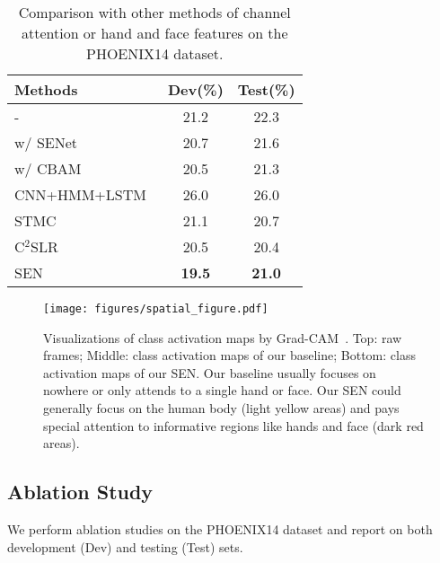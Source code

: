 \documentclass[letterpaper]{article} \usepackage{aaai23}  \usepackage{times}  \usepackage{helvet}  \usepackage{courier}  \usepackage[hyphens]{url}  \usepackage{graphicx} \urlstyle{rm} \def\UrlFont{\rm}  \usepackage{natbib}  \usepackage{caption} \frenchspacing  \setlength{\pdfpagewidth}{8.5in} \setlength{\pdfpageheight}{11in} \usepackage{algorithm}
\begin{document}
\begin{table}[t]   
  \centering
  \setlength\tabcolsep{3pt}
  \begin{tabular}{lcc}
  \hline
  Methods & Dev(\%) & Test(\%)\\
  \hline
  - & 21.2 & 22.3\\
  w/ SENet~\cite{hu2018squeeze}  & 20.7  & 21.6 \\
  w/ CBAM~\cite{woo2018cbam} & 20.5 & 21.3 \\
  \hline
  CNN+HMM+LSTM~\cite{koller2019weakly} & 26.0  & 26.0 \\
  STMC~\cite{zhou2020spatial} & 21.1  & 20.7 \\
  C$^2$SLR~\cite{zuo2022c2slr} & 20.5  & 20.4 \\
  \hline
  SEN & \textbf{19.5} & \textbf{21.0} \\
  \hline
  \end{tabular}
  \caption{Comparison with other methods of channel attention or hand and face features on the PHOENIX14 dataset.} 
  \label{tab6} 
  \end{table}

\begin{figure}[t]
  \centering
  \texttt{[image: figures/spatial\_figure.pdf]}
  \caption{Visualizations of class activation maps by Grad-CAM~\cite{selvaraju2017grad}. Top: raw frames; Middle: class activation maps of our baseline; Bottom: class activation maps of our SEN. Our baseline usually focuses on nowhere or only attends to a single hand or face. Our SEN could generally focus on the human body (light yellow areas) and pays special attention to informative regions like hands and face (dark red areas).}
  \label{fig5}
  \end{figure}  

\subsection{Ablation Study}
We perform ablation studies on the PHOENIX14 dataset and report on both development (Dev) and testing (Test) sets. 
\end{document}
